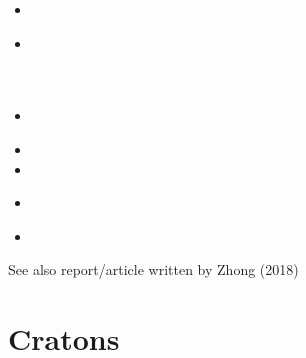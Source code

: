 \begin{small}
\begin{itemize}
\item[\twothousandeighteen] 
 \\
\item[\twothousandnineteen] 
\\
\\
\\
\item[\twothousandtwenty] 
\\
\item[\twothousandtwentyone] 
\item[\twothousandtwentytwo] 
\item[\twothousandtwentythree] 
 \\
\item[\twothousandtwentyfour]
 \\ 
\end{itemize}
\end{small}

See also report/article written by Zhong (2018) \textcite{zhon18}

\section{Cratons}

